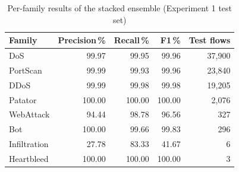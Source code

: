 \begin{table}[!htbp]
\centering
\caption{Per-family results of the stacked ensemble (Experiment 1 test set)}
\label{tab:perclass}
\small
\begin{tabular}{@{}lrrrr@{}}
\toprule
\textbf{Family} & \textbf{Precision\,\%} & \textbf{Recall\,\%} & \textbf{F1\,\%} & \textbf{Test flows} \\
\midrule
DoS & 99.97 & 99.95 & 99.96 & 37,900 \\
PortScan & 99.99 & 99.93 & 99.96 & 23,840 \\
DDoS & 99.99 & 99.98 & 99.98 & 19,205 \\
Patator & 100.00 & 100.00 & 100.00 & 2,076 \\
WebAttack & 94.44 & 98.78 & 96.56 & 327 \\
Bot & 100.00 & 99.66 & 99.83 & 296 \\
Infiltration & 27.78 & 83.33 & 41.67 & 6 \\
Heartbleed & 100.00 & 100.00 & 100.00 & 3 \\
\bottomrule
\end{tabular}
\end{table}
